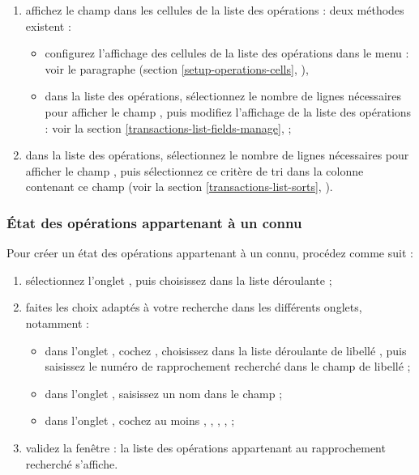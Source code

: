 \begin{enumerate}
	\item affichez le champ  dans les cellules de la liste des opérations : deux méthodes existent :
		\begin{itemize}
			\item configurez l'affichage des cellules de la liste des opérations dans le menu  : voir le paragraphe  (section \vref{setup-operations-cells}, ),
			\item dans la liste des opérations, sélectionnez le nombre de lignes nécessaires pour afficher le champ , puis modifiez l'affichage de la liste des opérations : voir la section \vref{transactions-list-fields-manage},  ;	 
		\end{itemize}			 	
	\item dans la liste des opérations, sélectionnez le nombre de lignes nécessaires pour afficher le champ , puis sélectionnez ce critère de tri dans la colonne contenant ce champ (voir la section \vref{transactions-list-sorts}, ).
\end{enumerate}


\subsubsection{État des opérations appartenant à un  connu\label{reconciliation-manage-content-report}}

Pour créer un état des opérations appartenant à un  connu, procédez comme suit :

\begin{enumerate}
	\item sélectionnez l'onglet , puis choisissez  dans la liste déroulante ; 
	\item faites les choix adaptés à votre recherche dans les différents onglets, notamment :
		\begin{itemize}
			\item dans l'onglet , cochez , choisissez  dans la liste déroulante de libellé , puis saisissez le numéro de rapprochement recherché dans le champ de libellé  ;
			\item dans l'onglet , saisissez un nom dans le champ  ;
			\item dans l'onglet , cochez au moins , , , , 	 ;
		\end{itemize}	
	
	\item validez la fenêtre : la liste des opérations appartenant au rapprochement recherché s'affiche.
\end{enumerate}

